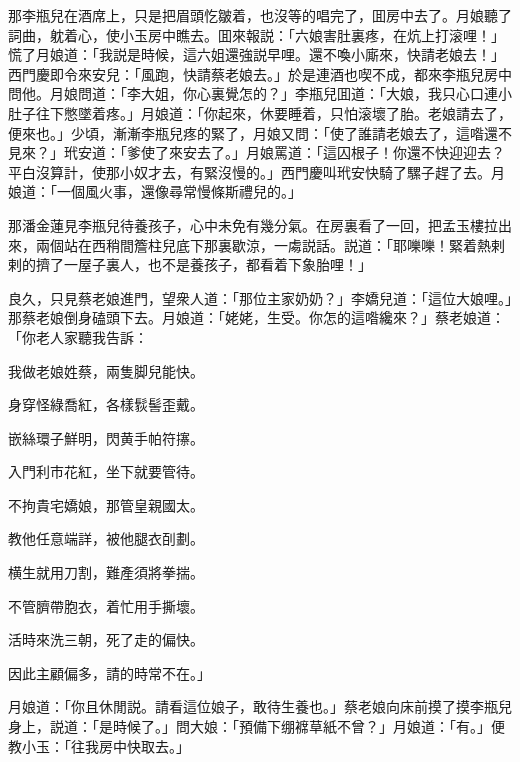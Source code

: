 那李瓶兒在酒席上，只是把眉頭忔皺着，也沒等的唱完了，囬房中去了。月娘聽了詞曲，躭着心，使小玉房中瞧去。囬來報説：「六娘害肚裏疼，在炕上打滚哩！」慌了月娘道：「我説是時候，這六姐還強説早哩。還不喚小廝來，快請老娘去！」西門慶即令來安兒：「風跑，快請蔡老娘去。」於是連酒也喫不成，都來李瓶兒房中問他。月娘問道：「李大姐，你心裏覺怎的？」李瓶兒囬道：「大娘，我只心口連小肚子往下憋墜着疼。」月娘道：「你起來，休要睡着，只怕滚壞了胎。老娘請去了，便來也。」少頃，漸漸李瓶兒疼的緊了，月娘又問：「使了誰請老娘去了，這喒還不見來？」玳安道：「爹使了來安去了。」月娘罵道：「這囚根子！你還不快迎迎去？平白沒算計，使那小奴才去，有緊沒慢的。」西門慶叫玳安快騎了騾子趕了去。月娘道：「一個風火事，還像尋常慢條斯禮兒的。」

那潘金蓮見李瓶兒待養孩子，心中未免有幾分氣。在房裏看了一回，把孟玉樓拉出來，兩個站在西稍間簷柱兒底下那裏歇涼，一䖏説話。説道：「耶嚛嚛！緊着熱剌剌的擠了一屋子裏人，也不是養孩子，都看着下象胎哩！」

良久，只見蔡老娘進門，望衆人道：「那位主家奶奶？」李嬌兒道：「這位大娘哩。」那蔡老娘倒身磕頭下去。月娘道：「姥姥，生受。你怎的這喒纔來？」蔡老娘道：「你老人家聽我告訴：

\begin{myquote}
我做老娘姓蔡，兩隻脚兒能快。

身穿怪綠喬紅，各樣䯼髻歪戴。

嵌絲環子鮮明，閃黄手帕符㩟。

入門利市花紅，坐下就要管待。

不拘貴宅嬌娘，那管皇親國太。

教他任意端詳，被他腿衣㓦劃。

横生就用刀割，難產須將拳揣。

不管臍帶胞衣，着忙用手撕壞。

活時來洗三朝，死了走的偏快。

因此主顧偏多，請的時常不在。」
\end{myquote}

月娘道：「你且休閒説。請看這位娘子，敢待生養也。」蔡老娘向床前摸了摸李瓶兒身上，説道：「是時候了。」問大娘：「預備下绷褯草紙不曾？」月娘道：「有。」便教小玉：「往我房中快取去。」

